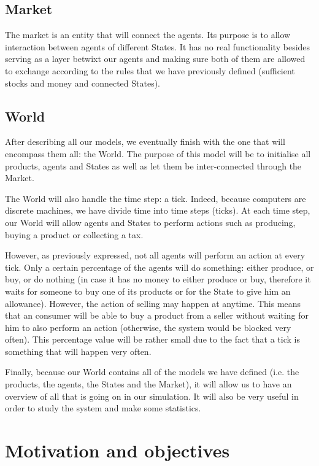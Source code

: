 \documentclass[12pt]{article}
\begin{document}
\subsection{Market}\label{section:market}
The market is an entity that will connect the agents. Its purpose is to allow interaction between agents of different States. It has no real functionality besides serving as a layer betwixt our agents and making sure both of them are allowed to exchange according to the rules that we have previously defined (sufficient stocks and money and connected States).

\subsection{World}\label{section:world}
After describing all our models, we eventually finish with the one that will encompass them all: the World. The purpose of this model will be to initialise all products, agents and States as well as let them be inter-connected through the Market.

The World will also handle the time step: a tick. Indeed, because computers are discrete machines, we have divide time into time steps (ticks). At each time step, our World will allow agents and States to perform actions such as producing, buying a product or collecting a tax.

However, as previously expressed, not all agents will perform an action at every tick. Only a certain percentage of the agents will do something: either produce, or buy, or do nothing (in case it has no money to either produce or buy, therefore it waits for someone to buy one of its products or for the State to give him an allowance). However, the action of selling may happen at anytime. This means that an consumer will be able to buy a product from a seller without waiting for him to also perform an action (otherwise, the system would be blocked very often).
This percentage value will be rather small due to the fact that a tick is something that will happen very often.

Finally, because our World contains all of the models we have defined (i.e. the products, the agents, the States and the Market), it will allow us to have an overview of all that is going on in our simulation. It will also be very useful in order to study the system and make some statistics.


\section{Motivation and objectives}\label{section:motivation_objectives}
\end{document}
